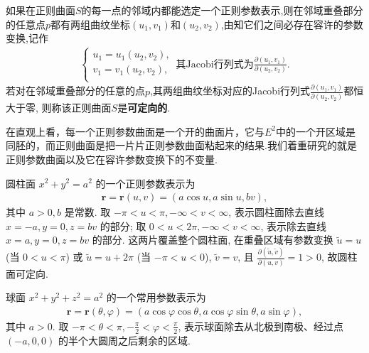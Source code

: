 \documentclass[../../main.tex]{subfiles}%
\begin{document}
\begin{definition}
如果在正则曲面$S$的每一点的邻域内都能选定一个正则参数表示,则在邻域重叠部分的任意点$p$都有两组曲纹坐标$(u_1,v_1)$和$(u_2,v_2)$,由知它们之间必存在容许的参数变换,记作
\begin{align*}
\begin{cases}
u_1=u_1\left( u_2,v_2 \right) ,\\
v_1=v_1\left( u_2,v_2 \right) ,\\
\end{cases}\, \text{其Jacobi行列式为}\frac{\partial \left( u_1,v_1 \right)}{\partial \left( u_2,v_2 \right)}.
\end{align*}
若对在邻域重叠部分的任意的点$p$,其两组曲纹坐标对应的Jacobi行列式$\frac{\partial \left( u_1,v_1 \right)}{\partial \left( u_2,v_2 \right)}$都恒大于零, 则称该正则曲面$S$是\textbf{可定向的}.
\end{definition}
\begin{remark}
在直观上看，每一个正则参数曲面是一个开的曲面片，它与$E^2$中的一个开区域是同胚的，而正则曲面是把一片片正则参数曲面粘起来的结果.我们着重研究的就是正则参数曲面以及它在容许参数变换下的不变量.
\end{remark}

\begin{example}[圆柱面]
圆柱面 \( x^2 + y^2 = a^2 \) 的一个正则参数表示为
\begin{align*}
\bm{r} = \bm{r}(u, v) = (a\cos u, a\sin u, bv),
\end{align*}
其中 \( a>0, b \) 是常数. 取 \( -\pi < u < \pi, -\infty < v < \infty \), 表示圆柱面除去直线 \( x=-a, y=0, z=bv \) 的部分; 取 \( 0<u<2\pi, -\infty<v<\infty \), 表示除去直线 \( x=a, y=0, z=bv \) 的部分. 这两片覆盖整个圆柱面, 在重叠区域有参数变换 \( \tilde{u} = u \) (当 \( 0<u<\pi \)) 或 \( \tilde{u} = u+2\pi \) (当 \( -\pi<u<0 \)), \( \tilde{v}=v \), 且 \( \frac{\partial(\tilde{u}, \tilde{v})}{\partial(u, v)} = 1 >0 \), 故圆柱面可定向.
\end{example}

\begin{example}[球面]
球面 \( x^2 + y^2 + z^2 = a^2 \) 的一个常用参数表示为
\begin{align*}
\bm{r} = \bm{r}(\theta, \varphi) = (a\cos\varphi\cos\theta, a\cos\varphi\sin\theta, a\sin\varphi),
\end{align*}
其中 \( a>0 \). 取 \( -\pi < \theta < \pi, -\frac{\pi}{2} < \varphi < \frac{\pi}{2} \), 表示球面除去从北极到南极、经过点 \( (-a,0,0) \) 的半个大圆周之后剩余的区域.
\end{example}
\end{document}
